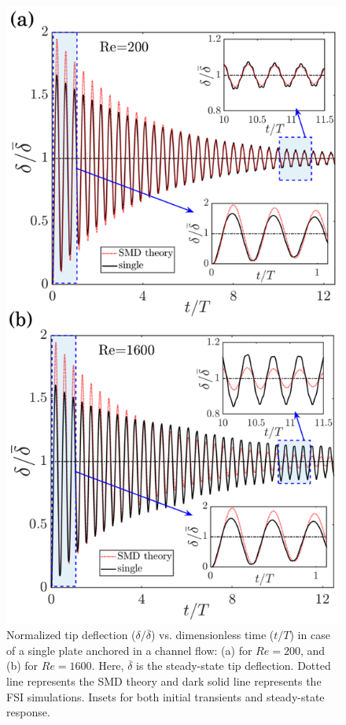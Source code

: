 \documentclass[aps,pre,twocolumn,aps,longbibliography]{revtex4-1}
\begin{document}
	
	\begin{figure}[b]
		\begin{minipage}[c]{0.8\linewidth}
			\includegraphics[width=1\linewidth]{Fig04.pdf} 
		\end{minipage} 
		\caption{Normalized tip deflection ($\delta/\overline{\delta}$) vs. dimensionless time ($t/T$) in case of a single plate anchored in a channel flow: (a) for $Re=200$, and (b) for $Re=1600$. Here, $\overline{\delta}$ is the steady-state tip deflection. Dotted line represents the SMD theory and dark solid line represents the FSI simulations. Insets for both initial transients and steady-state response.}
		\label{damping_singlefil}
	\end{figure}
	
\end{document}
